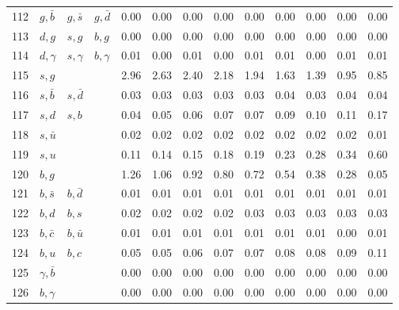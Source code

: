\begin{tabularx}{\textwidth}{rXXX@{}S@{}S@{}S@{}S@{}S@{}S@{}S@{}S@{}S}
112 & $g, \bar b$      & $g, \bar s$       & $g, \bar d$      &  0.00 &  0.00 &  0.00 &  0.00 &  0.00 &  0.00 &  0.00 &  0.00 &  0.00 \\
113 & $d, g$           & $s,  g$           & $b,  g$          &  0.00 &  0.00 &  0.00 &  0.00 &  0.00 &  0.00 &  0.00 &  0.00 &  0.00 \\
114 & $d, \gamma$      & $s, \gamma$       & $b, \gamma$      &  0.01 &  0.00 &  0.01 &  0.00 &  0.01 &  0.01 &  0.00 &  0.01 &  0.01 \\
115 & $s, g$           &                   &                  &  2.96 &  2.63 &  2.40 &  2.18 &  1.94 &  1.63 &  1.39 &  0.95 &  0.85 \\
116 & $s, \bar b$      & $s, \bar d$       &                  &  0.03 &  0.03 &  0.03 &  0.03 &  0.03 &  0.04 &  0.03 &  0.04 &  0.04 \\
117 & $s, d$           & $s,  b$           &                  &  0.04 &  0.05 &  0.06 &  0.07 &  0.07 &  0.09 &  0.10 &  0.11 &  0.17 \\
118 & $s, \bar u$      &                   &                  &  0.02 &  0.02 &  0.02 &  0.02 &  0.02 &  0.02 &  0.02 &  0.02 &  0.01 \\
119 & $s, u$           &                   &                  &  0.11 &  0.14 &  0.15 &  0.18 &  0.19 &  0.23 &  0.28 &  0.34 &  0.60 \\
120 & $b, g$           &                   &                  &  1.26 &  1.06 &  0.92 &  0.80 &  0.72 &  0.54 &  0.38 &  0.28 &  0.05 \\
121 & $b, \bar s$      & $b, \bar d$       &                  &  0.01 &  0.01 &  0.01 &  0.01 &  0.01 &  0.01 &  0.01 &  0.01 &  0.01 \\
122 & $b, d$           & $b,  s$           &                  &  0.02 &  0.02 &  0.02 &  0.02 &  0.03 &  0.03 &  0.03 &  0.03 &  0.03 \\
123 & $b, \bar c$      & $b, \bar u$       &                  &  0.01 &  0.01 &  0.01 &  0.01 &  0.01 &  0.01 &  0.01 &  0.00 &  0.01 \\
124 & $b, u$           & $b,  c$           &                  &  0.05 &  0.05 &  0.06 &  0.07 &  0.07 &  0.08 &  0.08 &  0.09 &  0.11 \\
125 & $\gamma, \bar b$ &                   &                  &  0.00 &  0.00 &  0.00 &  0.00 &  0.00 &  0.00 &  0.00 &  0.00 &  0.00 \\
126 & $b, \gamma$      &                   &                  &  0.00 &  0.00 &  0.00 &  0.00 &  0.00 &  0.00 &  0.00 &  0.00 &  0.00 \\

\end{tabularx}
